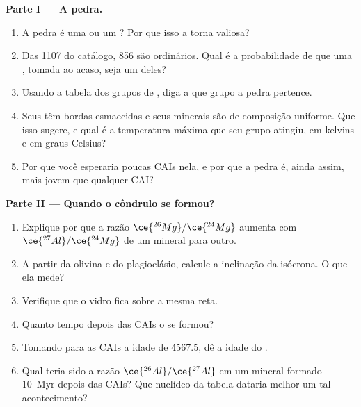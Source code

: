 \begin{problem}
\medskip
\noindent\textbf{Parte I --- A pedra.}
\begin{enumerate}
  \item A pedra é uma  ou um ? Por que isso a torna valiosa?
  \item Das \num{1107}  do catálogo, 856 são  ordinários. Qual
        é a probabilidade de que uma , tomada ao acaso, seja um deles?
  \item Usando a tabela dos grupos de , diga a que grupo a pedra pertence.
  \item Seus  têm bordas esmaecidas e seus minerais são de composição
        uniforme. Que  isso sugere, e qual é a
        temperatura máxima que seu grupo atingiu, em kelvins e em graus Celsius?
  \item Por que você esperaria poucas CAIs nela, e por que a pedra é, ainda assim,
        mais jovem que qualquer CAI?
\end{enumerate}

\noindent\textbf{Parte II --- Quando o côndrulo se formou?}
\begin{enumerate}[resume]
  \item Explique por que a razão $\ce{^{26}Mg}/\ce{^{24}Mg}$ aumenta com
        $\ce{^{27}Al}/\ce{^{24}Mg}$ de um mineral para outro.
  \item A partir da olivina e do plagioclásio, calcule a inclinação da isócrona.
        O que ela mede?
  \item Verifique que o vidro fica sobre a mesma reta.
  \item Quanto tempo depois das CAIs o  se formou?
  \item Tomando para as CAIs a idade de \qty{4567.5}{\Ma}, dê a idade do .
  \item Qual teria sido a razão $\ce{^{26}Al}/\ce{^{27}Al}$ em um mineral formado
        \qty{10}{Myr} depois das CAIs? Que nuclídeo da tabela dataria melhor um tal
        acontecimento?
\end{enumerate}


\end{problem}
